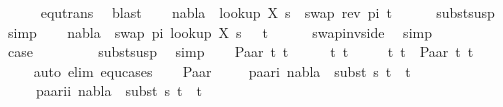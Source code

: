 \begin{isabellebody}
\ \ \ \ \isamarkupfalse%
\ equ{\isacharunderscore}{\kern0pt}trans\ \isamarkupfalse%
\ blast\isanewline
\ \ \isamarkupfalse%
\ {\isachardoublequoteopen}nabla\ {\isasymturnstile}\ {\isacharparenleft}{\kern0pt}look{\isacharunderscore}{\kern0pt}up\ X\ s{}{\isacharparenright}{\kern0pt}\ {\isasymapprox}\ swap\ {\isacharparenleft}{\kern0pt}rev\ pi{\isacharparenright}{\kern0pt}\ t{}{\isachardoublequoteclose}\isanewline
\ \ \ \ \isamarkupfalse%
\ subst{\isacharunderscore}{\kern0pt}susp\ \isamarkupfalse%
\ simp\isanewline
\ \ \isamarkupfalse%
\ {\isachardoublequoteopen}nabla\ {\isasymturnstile}\ swap\ pi\ {\isacharparenleft}{\kern0pt}look{\isacharunderscore}{\kern0pt}up\ X\ s{}{\isacharparenright}{\kern0pt}\ {\isasymapprox}\ \ t{}{\isachardoublequoteclose}\isanewline
\ \ \ \ \isamarkupfalse%
\ swap{\isacharunderscore}{\kern0pt}inv{\isacharunderscore}{\kern0pt}side\ \isamarkupfalse%
\ simp\isanewline
\ \ \ \ \isamarkupfalse%
\ \isamarkupfalse%
\ {\isacharquery}{\kern0pt}case\ \isanewline
\ \ \ \ \ \ \isamarkupfalse%
\ subst{\isacharunderscore}{\kern0pt}susp\ \isamarkupfalse%
\ simp\isanewline
{}\isamarkupfalse%
\isanewline
\ \ \isamarkupfalse%
\ {\isacharparenleft}{\kern0pt}Paar\ t{}{}\ t{}{}{\isacharparenright}{\kern0pt}\isanewline
\ \ \isamarkupfalse%
\ \isamarkupfalse%
\ t{}{}\ t{}{}\isanewline
\ \ \ \ \ t{}{\isacharcolon}{\kern0pt}\ {\isachardoublequoteopen}t{}\ {\isacharequal}{\kern0pt}\ Paar\ t{}{}\ t{}{}{\isachardoublequoteclose}\isanewline
\ \ \ \ \isamarkupfalse%
{\isacharparenleft}{\kern0pt}auto\ elim{\isacharcolon}{\kern0pt}\ equ{\isachardot}{\kern0pt}cases{\isacharparenright}{\kern0pt}\isanewline
\ \ \isamarkupfalse%
\ Paar{\isacharparenleft}{\kern0pt}{}{\isacharparenright}{\kern0pt}\ \isanewline
\ \ \isamarkupfalse%
\ paar{\isacharunderscore}{\kern0pt}i{\isacharcolon}{\kern0pt}\ {\isachardoublequoteopen}nabla\ {\isasymturnstile}\ subst\ s{}\ t{}{}\ {\isasymapprox}\ t{}{}{\isachardoublequoteclose}\isanewline
\ \ \ \ \ paar{\isacharunderscore}{\kern0pt}ii{\isacharcolon}{\kern0pt}\ {\isachardoublequoteopen}nabla\ {\isasymturnstile}\ subst\ s{}\ t{}{}\ {\isasymapprox}\ t{}{}{\isachardoublequoteclose}\isanewline

\end{isabellebody}
